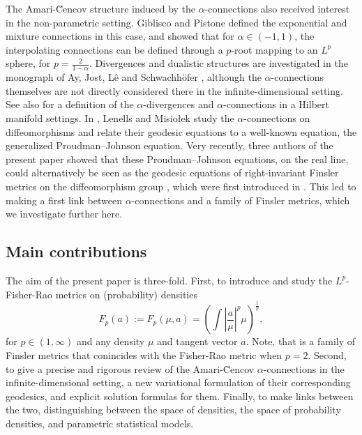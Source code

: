 \documentclass[11pt]{amsart}
\theoremstyle{definition}
\newcommand{\Abs}[1]{\left|#1\right|}
\begin{document}
The Amari-\u{C}encov structure induced by the $\alpha$-connections also received interest in the non-parametric setting. Giblisco and Pistone \cite{gibilisco1998connections} defined the exponential and mixture connections in this case, and showed that for $\alpha\in (-1,1)$, the interpolating connections can be defined through a $p$-root mapping to an $L^p$ sphere, for $p=\frac2{1-\alpha}$. 
Divergences and dualistic structures are investigated in the monograph of Ay, Jost, Lê and Schwachhöfer \cite{ay2017information}, although the $\alpha$-connections themselves are not directly considered there in the infinite-dimensional setting. 
See also \cite{newton2012infinite} for a definition of the $\alpha$-divergences and $\alpha$-connections in a Hilbert manifold settings.
In \cite{lenells2014amari}, Lenells and Misio\l{}ek study the $\alpha$-connections on diffeomorphisms and relate their geodesic equations to a well-known equation, the generalized Proudman--Johnson equation. 
Very recently, three authors of the present paper showed that these Proudman--Johnson equations, on the real line, could alternatively be seen as the geodesic equations of right-invariant Finsler metrics on the diffeomorphism group \cite{bauer2022geometric}, which were first introduced in \cite{cotter2020r}. 
This led to making a first link between $\alpha$-connections and a family of Finsler metrics, which we investigate further here.

\subsection{Main contributions}
The aim of the present paper is three-fold. First, to introduce and study the $L^p$-Fisher-Rao metrics on (probability) densities
$$F_p(a):=F_p({\mu},a)=\left(\int\Abs{\frac{a}{\mu}}^p\mu\right)^{\frac{1}{p}},$$
for $p\in(1,\infty)$ and any density $\mu$ and tangent vector $a$. Note, that is a family of Finsler metrics that conincides with the Fisher-Rao metric when $p=2$. Second, to give a precise and rigorous review of the Amari-\u{C}encov $\alpha$-connections in the infinite-dimensional setting, a new variational formulation of their corresponding geodesics, and explicit solution formulas for them. Finally, to make links between the two, distinguishing between the space of densities, the space of probability densities, and parametric statistical models.
\end{document}
